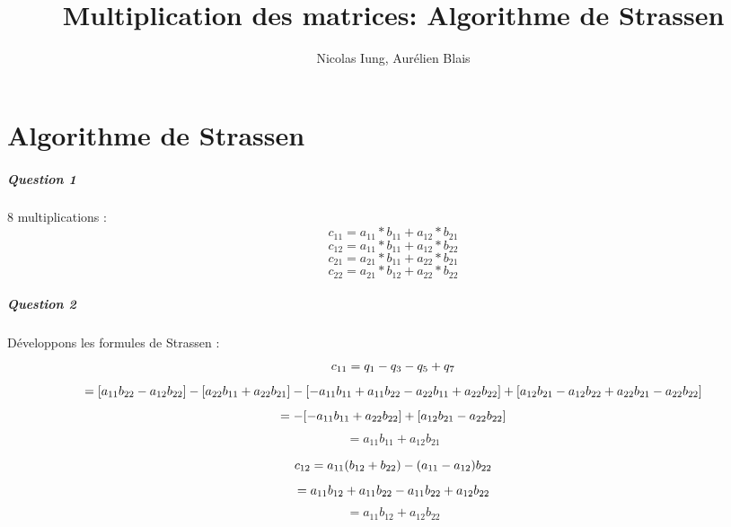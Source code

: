 \documentclass[a4paper,10pt,margin=2in]{report}
\title{Multiplication des matrices: Algorithme de Strassen}
\author{Nicolas Iung, Aurélien Blais}
\begin{document}
\maketitle

\chapter{Algorithme de Strassen}
\paragraph{Question 1}
8 multiplications :
\begin{equation}
 c_{11} = a_{11}*b_{11}+a_{12}*b_{21}
\end{equation}
\begin{equation}
 c_{12} = a_{11}*b_{11}+a_{12}*b_{22}
\end{equation}
\begin{equation}
 c_{21} = a_{21}*b_{11}+a_{22}*b_{21}
\end{equation}
\begin{equation}
 c_{22} = a_{21}*b_{12}+a_{22}*b_{22}
\end{equation}
\paragraph{Question 2}
Développons les formules de Strassen :\\
\begin{equation*}
c_{11} = q_{1} - q_{3} - q_{5} + q_{7}\\
\end{equation*}
\begin{equation*}
 = [a_{11}b_{22} - a_{12}b_{22}] - [a_{22}b_{11} + a_{22}b_{21}] - [- a_{11}b_{11} + a_{11}b_{22} - a_{22}b_{11} + a_{22}b_{22}] + [a_{12}b_{21} - a_{12}b_{22} + a_{22}b_{21} - a_{22}b_{22}]\\
 \end{equation*}
 \begin{equation*}
 =  - [- a_{11}b_{11} + a_{22}b_{22}] + [a_{12}b_{21} - a_{22}b_{22}]\\
 \end{equation*}
 \begin{equation*}
 = a_{11}b_{11} + a_{12}b_{21}
\end{equation*}

\bigskip
\begin{equation*}
c_{12} = a_{11}(b_{12} + b_{22}) - (a_{11} - a_{12})b_{22}\\
\end{equation*}
\begin{equation*} 
= a_{11}b_{12} + a_{11}b_{22} - a_{11}b_{22} + a_{12}b_{22}\\
\end{equation*}
\begin{equation*}
= a_{11}b_{12} + a_{12}b_{22}
\end{equation*}
\end{document}
